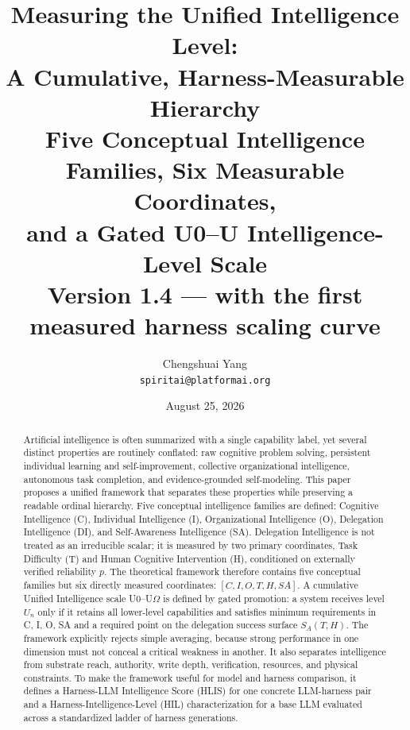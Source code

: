 \documentclass[11pt]{article}
\title{\LARGE Measuring the Unified Intelligence Level:\\[6pt]
A Cumulative, Harness-Measurable Hierarchy\\[8pt]
\large Five Conceptual Intelligence Families, Six Measurable Coordinates,\\
and a Gated U0--U\Om{} Intelligence-Level Scale\\[10pt]
\normalsize Version 1.4 --- with the first measured harness scaling curve}
\author{Chengshuai Yang\\
\small\texttt{spiritai@platformai.org}}
\date{August 25, 2026}
\theoremstyle{definition}
\newcommand{\Om}{\ensuremath{\Omega}}
\newcommand{\SA}{\ensuremath{S_A(T,H)}}
\begin{document}
\maketitle

\begin{abstract}
Artificial intelligence is often summarized with a single capability label, yet several distinct properties are routinely conflated: raw cognitive problem solving, persistent individual learning and self-improvement, collective organizational intelligence, autonomous task completion, and evidence-grounded self-modeling. This paper proposes a unified framework that separates these properties while preserving a readable ordinal hierarchy. Five conceptual intelligence families are defined: Cognitive Intelligence (C), Individual Intelligence (I), Organizational Intelligence (O), Delegation Intelligence (DI), and Self-Awareness Intelligence (SA). Delegation Intelligence is not treated as an irreducible scalar; it is measured by two primary coordinates, Task Difficulty (T) and Human Cognitive Intervention (H), conditioned on externally verified reliability $p$. The theoretical framework therefore contains five conceptual families but six directly measured coordinates: $[C, I, O, T, H, SA]$. A cumulative Unified Intelligence scale U0--U\Om{} is defined by gated promotion: a system receives level $U_n$ only if it retains all lower-level capabilities and satisfies minimum requirements in C, I, O, SA and a required point on the delegation success surface \SA{}. The framework explicitly rejects simple averaging, because strong performance in one dimension must not conceal a critical weakness in another. It also separates intelligence from substrate reach, authority, write depth, verification, resources, and physical constraints. To make the framework useful for model and harness comparison, it defines a Harness-LLM Intelligence Score (HLIS) for one concrete LLM-harness pair and a Harness-Intelligence-Level (HIL) characterization for a base LLM evaluated across a standardized ladder of harness generations.


\end{abstract}
\end{document}
